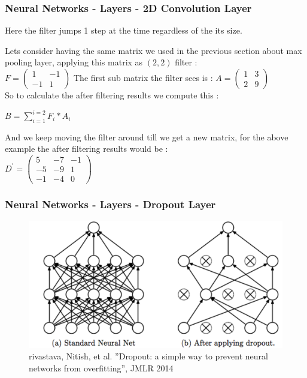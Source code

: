 \documentclass{beamer}
\begin{document}
\begin{frame}
\frametitle{Neural Networks - Layers - 2D Convolution Layer}
Here the filter jumps 1 step at the time regardless of the its size.\\
\begin{example}
Lets consider having the same matrix we used in the previous section about max pooling layer, applying this matrix as $ (2,2) $ filter :\\
$F = 
\begin{pmatrix}
1 & -1\\
-1 & 1
\end{pmatrix}
$
The first sub matrix the filter sees is : 
$A = 
\begin{pmatrix}
1 & 3\\
2 & 9
\end{pmatrix}
$\\
So to calculate the after filtering results we compute this :\\
\begin{center}
$ B = \sum_{i=1}^{i=2}F_i*A_i $
\end{center}
And we keep moving the filter around till we get a new matrix, for the above example the after filtering results would be :\\
$D^{\prime} = 
\begin{pmatrix}
5 & -7 & -1\\
-5 & -9 & 1\\
-1 & -4 & 0
\end{pmatrix}
$
\end{example}
\end{frame}

\begin{frame}
\frametitle{Neural Networks - Layers - Dropout Layer}
\begin{figure}
\centering
\includegraphics[scale=0.3]{dropout.png}
\caption{rivastava, Nitish, et al. ”Dropout: a simple way to prevent neural networks from
overfitting”, JMLR 2014}
\end{figure}
\end{frame}
\end{document}
